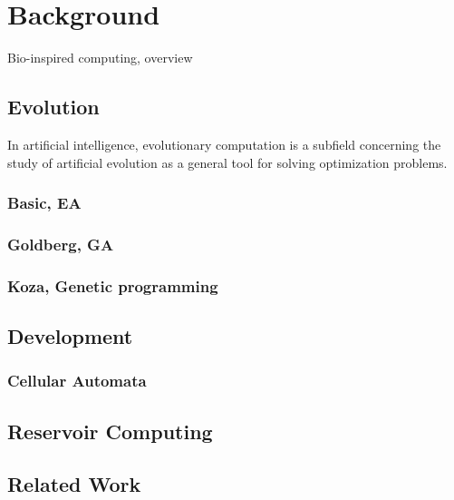 
\chapter{Background}

Bio-inspired computing, overview

\section{Evolution}

In artificial intelligence, evolutionary computation is a subfield concerning
the study of artificial evolution as a general tool for solving optimization
problems.

\subsection{Basic, EA}



\subsection{Goldberg, GA}

\subsection{Koza, Genetic programming}

\section{Development}

\subsection{Cellular Automata}

\section{Reservoir Computing}

\section{Related Work}
\cleardoublepage